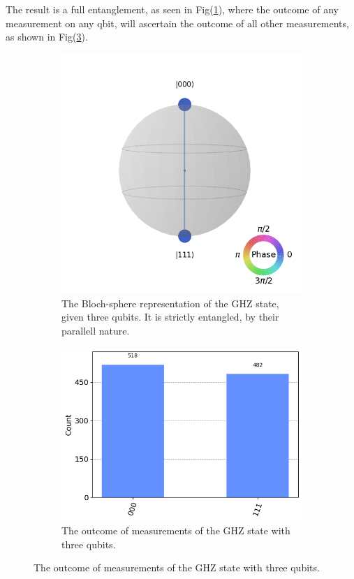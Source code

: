 The result is a full entanglement, as seen in Fig(\ref{fig:qshpere}), where the outcome of any measurement on any qbit, will ascertain the outcome of all other measurements, as shown in Fig(\ref{fig:GHZ_measure}).
\begin{figure}[H]
    \centering
    \begin{subfigure}{0.48\textwidth}
        \includegraphics[width=\textwidth]{figs/GHZ qsphere.png}
        \caption{The Bloch-sphere representation of the GHZ state, given three qubits. It is strictly entangled, by their parallell nature.}
        \label{fig:qshpere}
    \end{subfigure}
    \hfill
    \begin{subfigure}{0.48\textwidth}
        \includegraphics[width=\textwidth]{figs/GHZ Counts.png}
        \caption{The outcome of measurements of the GHZ state with three qubits.}
        \label{fig:GHZ_measure}
    \end{subfigure}
\end{figure}
